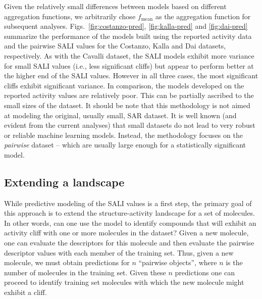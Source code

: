 \documentclass[letterpaper, 12pt]{article}
\begin{document}
Given the relatively small differences between models based on different aggregation functions, we
arbitrarily chose $f_{\textrm{mean}}$ as the aggregation function for subsequent
analyses. Figs.~\ref{fig:costanzo-pred}, \ref{fig:kalla-pred} and \ref{fig:dai-pred} summarize the
performance of the models built using the reported activity data and the pairwise SALI values for
the Costanzo, Kalla and Dai datasets, respectively. As with the Cavalli dataset, the SALI models
exhibit more variance for small SALI values (i.e., less significant cliffs) but appear to perform
better at the higher end of the SALI values. However in all three cases, the most significant cliffs
exhibit significant variance. In comparison, the models developed on the reported activity values
are relatively poor. This can be partially ascribed to the small sizes of the dataset. It should be
note that this methodology is not aimed at modeling the original, usually small, SAR dataset. It is
well known (and evident from the current analyses) that small datasets do not lead to very robust or
reliable machine learning models. Instead, the methodology focuses on the \emph{pairwise} dataset --
which are usually large enough for a statistically significant model.

\subsection{Extending a landscape}
\label{sec:extending-landscape}

While predictive modeling of the SALI values is a first step, the primary goal of this approach is
to extend the structure-activity landscape for a set of molecules. In other words, can one use
the model to identify compounds that will exhibit an activity cliff with one or more molecules in
the dataset? Given a new molecule, one can evaluate the descriptors for this molecule and then
evaluate the pairwise descriptor values with each member of the training set. Thus, given a new
molecule, we must obtain predictions for $n$ ``pairwise objects'', where $n$ is the number of
molecules in the training set. Given these $n$ predictions one can proceed to identify training set
molecules with which the new molecule might exhibit a cliff.
\end{document}
